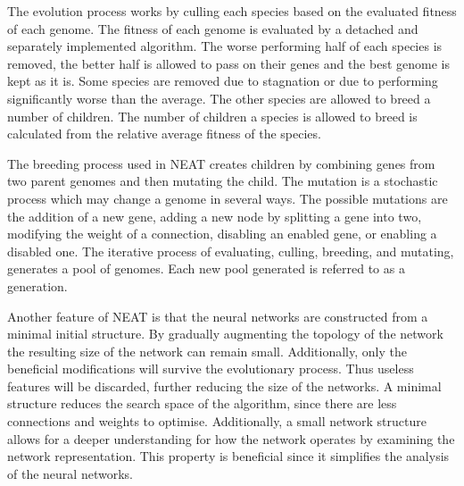 The evolution process works by culling each species based on the evaluated fitness of each genome. The fitness of each genome is evaluated by a detached and separately implemented algorithm. The worse performing half of each species is removed, the better half is allowed to pass on their genes and the best genome is kept as it is. Some species are removed due to stagnation or due to performing significantly worse than the average. The other species are allowed to breed a number of children. The number of children a species is allowed to breed is calculated from the relative average fitness of the species.

The breeding process used in NEAT creates children by combining genes from two parent genomes and then mutating the child. The mutation is a stochastic process which may change a genome in several ways. The possible mutations are the addition of a new gene, adding a new node by splitting a gene into two, modifying the weight of a connection, disabling an enabled gene, or enabling a disabled one. The iterative process of evaluating, culling, breeding, and mutating, generates a pool of genomes. Each new pool generated is referred to as a generation.

Another feature of NEAT is that the neural networks are constructed from a minimal initial structure. By gradually augmenting the topology of the network the resulting size of the network can remain small. Additionally, only the beneficial modifications will survive the evolutionary process. Thus useless features will be discarded, further reducing the size of the networks. A minimal structure reduces the search space of the algorithm, since there are less connections and weights to optimise. Additionally, a small network structure allows for a deeper understanding for how the network operates by examining the network representation. This property is beneficial since it simplifies the analysis of the neural networks.
